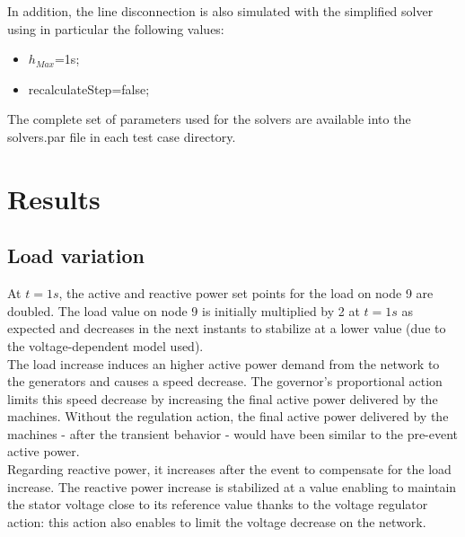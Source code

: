\documentclass[a4paper, 12pt]{report}
\begin{document}
In addition, the line disconnection is also simulated with the simplified solver using in particular the following values:
\begin{itemize}
\item $h_{Max}$=1s;
\item recalculateStep=false;
\end{itemize}

The complete set of parameters used for the solvers are available into the solvers.par file in each test case directory.

\newpage
\section{Results}

\subsection{Load variation}
\label{LoadVariation}

At $t=1s$, the active and reactive power set points for the load on node 9 are doubled. The load value on node 9 is initially multiplied by 2 at $t=1s$ as expected and decreases in the next instants to stabilize at a lower value (due to the voltage-dependent model used). \\

The load increase induces an higher active power demand from the network to the generators and causes a speed decrease. The governor's proportional action limits this speed decrease by increasing the final active power delivered by the machines. Without the regulation action, the final active power delivered by the machines - after the transient behavior - would have been similar to the pre-event active power. \\

Regarding reactive power, it increases after the event to compensate for the load increase. The reactive power increase is stabilized at a value enabling to maintain the stator voltage close to its reference value thanks to the voltage regulator action: this action also enables to limit the voltage decrease on the network.
\end{document}
